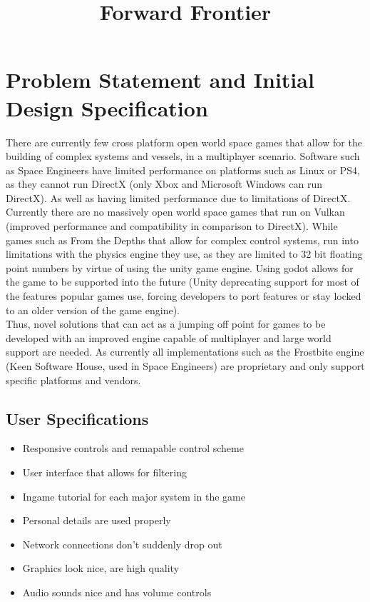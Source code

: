 \documentclass[12pt, DIV=calc]{scrartcl}
\title{Forward Frontier}
\author{\authorid}
\begin{document}
\section{Problem Statement and Initial Design Specification}
There are currently few cross platform open world space games that allow for the building of complex systems and vessels, in a multiplayer scenario. Software such as Space Engineers have limited performance on platforms such as Linux or PS4, as they cannot run DirectX (only Xbox and Microsoft Windows can run DirectX). As well as having limited performance due to limitations of DirectX. Currently there are no massively open world space games that run on Vulkan (improved performance and compatibility in comparison to DirectX). While games such as From the Depths that allow for complex control systems, run into limitations with the physics engine they use, as they are limited to 32 bit floating point numbers by virtue of using the unity game engine. Using godot allows for the game to be supported into the future (Unity deprecating support for most of the features popular games use, forcing developers to port features or stay locked to an older version of the game engine). \\

\noindent Thus, novel solutions that can act as a jumping off point for games to be developed with an improved engine capable of multiplayer and large world support are needed. As currently all implementations such as the Frostbite engine (Keen Software House, used in Space Engineers) are proprietary and only support specific platforms and vendors.
\subsection{User Specifications}
\begin{itemize}
\item Responsive controls and remapable control scheme
\item User interface that allows for filtering
\item Ingame tutorial for each major system in the game
\item Personal details are used properly
\item Network connections don't suddenly drop out
\item Graphics look nice, are high quality
\item Audio sounds nice and has volume controls
\end{itemize}
\end{document}

